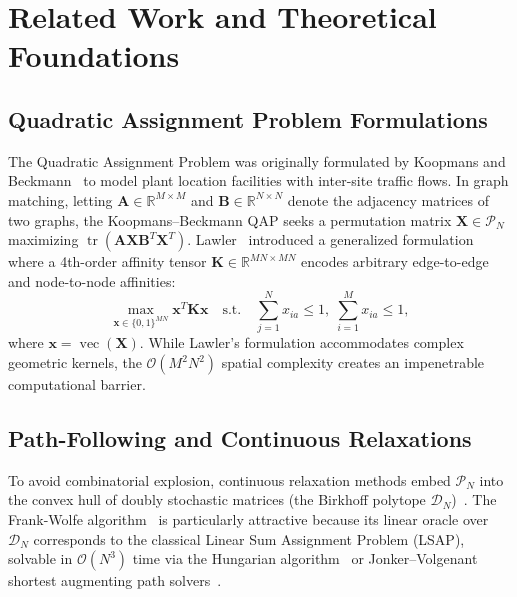 \documentclass[a4paper,fleqn]{cas-dc}
\theoremstyle{thmstyleone}
\theoremstyle{thmstyletwo}
\theoremstyle{thmstylethree}
\begin{document}
\section{Related Work and Theoretical Foundations}
\label{sec:related}

\subsection{Quadratic Assignment Problem Formulations}
The Quadratic Assignment Problem was originally formulated by Koopmans and Beckmann~\cite{koopmans1957} to model plant location facilities with inter-site traffic flows. In graph matching, letting $\mathbf{A} \in \mathbb{R}^{M \times M}$ and $\mathbf{B} \in \mathbb{R}^{N \times N}$ denote the adjacency matrices of two graphs, the Koopmans--Beckmann QAP seeks a permutation matrix $\mathbf{X} \in \mathcal{P}_N$ maximizing $\operatorname{tr}(\mathbf{A}\mathbf{X}\mathbf{B}^T\mathbf{X}^T)$. Lawler~\cite{lawler1963} introduced a generalized formulation where a 4th-order affinity tensor $\mathbf{K} \in \mathbb{R}^{MN \times MN}$ encodes arbitrary edge-to-edge and node-to-node affinities:
\begin{equation}
\max_{\mathbf{x} \in \{0, 1\}^{MN}} \mathbf{x}^T \mathbf{K} \mathbf{x} \quad \text{s.t.} \quad \sum_{j=1}^N x_{ia} \le 1, \; \sum_{i=1}^M x_{ia} \le 1,
\label{eq:lawler_qap}
\end{equation}
where $\mathbf{x} = \operatorname{vec}(\mathbf{X})$. While Lawler's formulation accommodates complex geometric kernels, the $\mathcal{O}(M^2 N^2)$ spatial complexity creates an impenetrable computational barrier.

\subsection{Path-Following and Continuous Relaxations}
To avoid combinatorial explosion, continuous relaxation methods embed $\mathcal{P}_N$ into the convex hull of doubly stochastic matrices (the Birkhoff polytope $\mathcal{D}_N$)~\cite{birkhoff1946}. The Frank-Wolfe algorithm~\cite{frank1956algorithm, jaggi2013revisiting} is particularly attractive because its linear oracle over $\mathcal{D}_N$ corresponds to the classical Linear Sum Assignment Problem (LSAP), solvable in $\mathcal{O}(N^3)$ time via the Hungarian algorithm~\cite{kuhn1955hungarian} or Jonker--Volgenant shortest augmenting path solvers~\cite{burkard2009assignment}.
\end{document}
